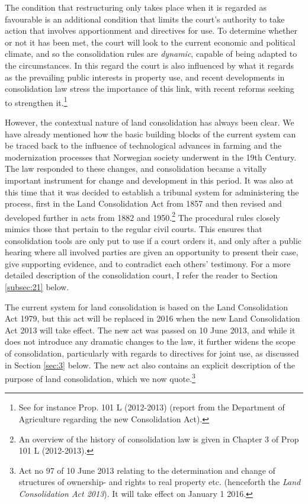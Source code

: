 The condition that restructuring only takes place when it is regarded as favourable is an additional condition that limits the court's authority to take action that involves apportionment and directives for use. To determine whether or not it has been met, the court will look to the current economic and political climate, and so the consolidation rules are \emph{dynamic}, capable of being adapted to the circumstances. In this regard the court is also influenced by what it regards as the prevailing public interests in property use, and recent developments in consolidation law stress the importance of this link, with recent reforms seeking to strengthen it.\footnote{See for instance Prop. 101 L (2012-2013) (report from the Department of Agriculture regarding the new Consolidation Act).}

However, the contextual nature of land consolidation has always been clear. We have already mentioned how the basic building blocks of the current system can be traced back to the influence of technological advances in farming and the modernization processes that Norwegian society underwent in the 19th Century. The law responded to these changes, and consolidation became a vitally important instrument for change and development in this period. It was also at this time that it was decided to establish a tribunal system for administering the process, first in the Land Consolidation Act from 1857 and then revised and developed further in acts from 1882 and 1950.\footnote{An overview of the history of consolidation law is given in Chapter 3 of Prop 101 L (2012-2013).} The procedural rules closely mimics those that pertain to the regular civil courts. This ensures that consolidation tools are only put to use if a court orders it, and only after a public hearing where all involved parties are given an opportunity to present their case, give supporting evidence, and to contradict each others' testimony. For a more detailed description of the consolidation court, I refer the reader to Section \ref{subsec:21} below.

The current system for land consolidation is based on the Land Consolidation Act 1979, but this act will be replaced in 2016 when the new Land Consolidation Act 2013 will take effect. The new act was passed on 10 June 2013, and while it does not introduce any dramatic changes to the law, it further widens the scope of consolidation, particularly with regards to directives for joint use, as discussed in Section \ref{sec:3} below. The new act also contains an explicit description of the purpose of land consolidation, which we now quote.\footnote{Act no 97 of 10 June 2013 relating to the determination and change of structures of ownership- and rights to real property etc. (henceforth the \emph{Land Consolidation Act 2013}). It will take effect on January 1 2016.}

